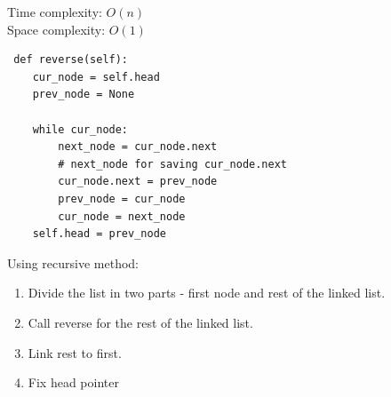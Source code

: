 \documentclass[a4paper,11pt]{book}
\begin{document}
\noindent Time complexity: $O(n)$\\
\noindent Space complexity: $O(1)$

\begin{lstlisting}
 def reverse(self):
    cur_node = self.head
    prev_node = None
    
    while cur_node:
        next_node = cur_node.next
        # next_node for saving cur_node.next
        cur_node.next = prev_node
        prev_node = cur_node
        cur_node = next_node
    self.head = prev_node
\end{lstlisting}

\noindent Using recursive method:

\begin{enumerate}
    \item Divide the list in two parts - first node and 
      rest of the linked list.
   \item Call reverse for the rest of the linked list.
   \item Link rest to first.
   \item Fix head pointer
\end{enumerate}
\end{document}
